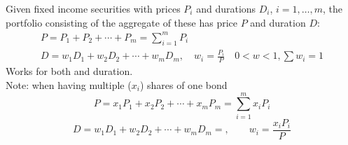

\begin{definition}
    Given fixed income securities with prices $P_i$ and durations $D_i$, $i = 1, \dots, m$, the portfolio consisting of the aggregate of these has price $P$ and duration $D$:
    \[\boxed{\begin{gathered}
        P = P_1 + P_2 + \cdots + P_m = \sum_{i=1}^{m} P_i\\
        D = w_1D_1 + w_2D_2 + \cdots + w_mD_m, \quad w_i = \frac{P_i}{P} \quad 0<w<1, \sum w_i = 1
    \end{gathered}}\]
    Works for both  and  duration.
    \\Note: when having multiple ($x_i$) shares of one bond
    \[P = x_1P_1 + x_2P_2 + \cdots + x_mP_m = \sum_{i=1}^m x_iP_i\]
    \[D = w_1D_1+w_2D_2 +\cdots + w_mD_m =, \qquad w_i = \frac{x_iP_i}{P}\]
\end{definition}

